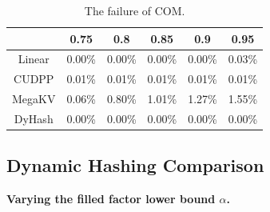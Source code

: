 \begin{table}[H]
	\caption{The failure of COM.}
	\centering
	\begin{tabular}{|c|c|c|c|c|c|}
		\hline
		& 0.75 & 0.8 & 0.85 & 0.9 & 0.95\\ \hline
		Linear &0.00\% & 0.00\% &0.00\%  & 0.00\% & 0.03\% \\ \hline
		CUDPP & 0.01\% & 0.01\% &0.01\%  & 0.01\% & 0.01\% \\ \hline
		MegaKV & 0.06\% & 0.80\% &1.01\%  & 1.27\% & 1.55\% \\ \hline
		DyHash &0.00\% & 0.00\% &0.00\%  & 0.00\% & 0.00\% \\ \hline
	\end{tabular}
	\label{tab:fail:com}
\end{table}








\subsection{Dynamic Hashing Comparison}\label{sec:exp:dynamic}

\vspace{1mm}\noindent\textbf{Varying the filled factor lower bound $\alpha$.}

